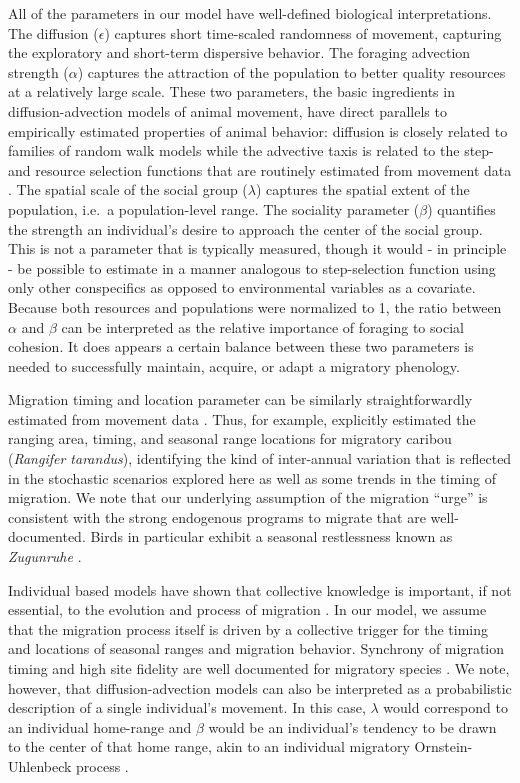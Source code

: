 \documentclass[utf8]{frontiersSCNS} %
\begin{document}
	All of the parameters in our model have well-defined biological interpretations. The diffusion ($\epsilon$) captures short time-scaled randomness of movement, capturing the exploratory and short-term dispersive behavior. The foraging advection strength ($\alpha$) captures the attraction of the population to better quality resources at a relatively large scale. These two parameters, the basic ingredients in diffusion-advection models of animal movement, have direct parallels to empirically estimated properties of animal behavior: diffusion is closely related to families of random walk models \citep{Gurarie2011} while the advective taxis is related to the step- and resource selection functions that are routinely estimated from movement data \citep{Potts2020}. The spatial scale of the social group ($\lambda$) captures the spatial extent of the population, i.e.~a population-level range. The sociality parameter ($\beta$) quantifies the strength an individual's desire to approach the center of the social group. This is not a parameter that is typically measured, though it would - in principle - be possible to estimate in a manner analogous to step-selection function using only other conspecifics as opposed to environmental variables as a covariate. Because both resources and populations were normalized to 1, the ratio between $\alpha$ and $\beta$ can be interpreted as the relative importance of foraging to social cohesion. It does appears a certain balance between these two parameters is needed to successfully maintain, acquire, or adapt a migratory phenology. 
	
	Migration timing and location parameter can be similarly straightforwardly estimated from movement data \citep{Cagnacci2015, Gurarie2019}. Thus, for example, \citet{Gurarie2019} explicitly estimated the ranging area, timing, and seasonal range locations for migratory caribou (\emph{Rangifer tarandus}), identifying the kind of inter-annual variation that is reflected in the stochastic scenarios explored here as well as some trends in the timing of migration. We note that our underlying assumption of the migration ``urge'' is consistent with the strong endogenous programs to migrate that are well-documented. Birds in particular exhibit a seasonal restlessness known as \emph{Zugunruhe} \citep{Berthold1999, Helm2006}.
	
	Individual based models have shown that collective knowledge is important, if not essential, to the evolution and process of migration \citep{Shaw2013, Guttal2010, Berdahl2018}. In our model, we assume that the migration process itself is driven by a collective trigger for the timing and locations of seasonal ranges and migration behavior. Synchrony of migration timing and high site fidelity are well documented for migratory species \citep{Gurarie2019, Joly2021}. We note, however, that diffusion-advection models can also be interpreted as a probabilistic description of a single individual's movement. In this case, $\lambda$ would correspond to an individual home-range and $\beta$ would be an individual's tendency to be drawn to the center of that home range, akin to an individual migratory Ornstein-Uhlenbeck process \citep{Gurarie2017}.
	
\end{document}
